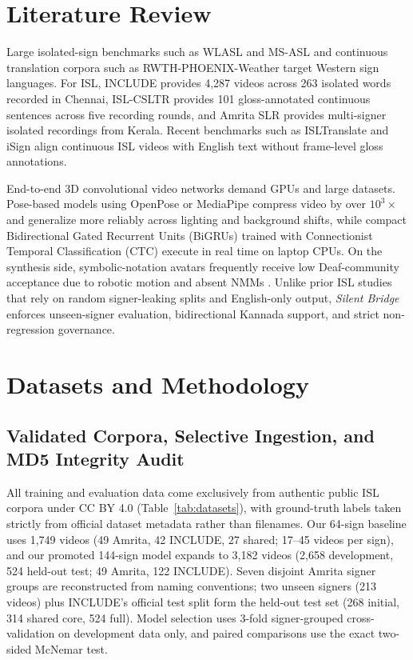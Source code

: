 \documentclass[a4paper,12pt]{article}
\begin{document}
\section{Literature Review}
Large isolated-sign benchmarks such as WLASL \cite{li2020wlasl} and MS-ASL \cite{joze2019msasl} and continuous translation corpora such as RWTH-PHOENIX-Weather \cite{koller2015phoenix,camgoz2018slt} target Western sign languages. For ISL, INCLUDE \cite{sridhar2020include} provides 4,287 videos across 263 isolated words recorded in Chennai, ISL-CSLTR \cite{elakkiya2021islcsltr} provides 101 gloss-annotated continuous sentences across five recording rounds, and Amrita SLR \cite{amrita2025slr} provides multi-signer isolated recordings from Kerala. Recent benchmarks such as ISLTranslate \cite{joshi2023isltranslate} and iSign \cite{joshi2024isign} align continuous ISL videos with English text without frame-level gloss annotations.

End-to-end 3D convolutional video networks \cite{carreira2017i3d} demand GPUs and large datasets. Pose-based models using OpenPose \cite{cao2021openpose} or MediaPipe \cite{lugaresi2019mediapipe} compress video by over $10^3\times$ and generalize more reliably across lighting and background shifts, while compact Bidirectional Gated Recurrent Units (BiGRUs) \cite{cho2014gru} trained with Connectionist Temporal Classification (CTC) \cite{graves2006ctc} execute in real time on laptop CPUs. On the synthesis side, symbolic-notation avatars frequently receive low Deaf-community acceptance due to robotic motion and absent NMMs \cite{wolfe2022avatars}. Unlike prior ISL studies that rely on random signer-leaking splits and English-only output, \textit{Silent Bridge} enforces unseen-signer evaluation, bidirectional Kannada support, and strict non-regression governance.

\section{Datasets and Methodology}
\subsection{Validated Corpora, Selective Ingestion, and MD5 Integrity Audit}
All training and evaluation data come exclusively from authentic public ISL corpora under CC BY 4.0 (Table~\ref{tab:datasets}), with ground-truth labels taken strictly from official dataset metadata rather than filenames. Our 64-sign baseline uses 1,749 videos (49 Amrita, 42 INCLUDE, 27 shared; 17--45 videos per sign), and our promoted 144-sign model expands to 3,182 videos (2,658 development, 524 held-out test; 49 Amrita, 122 INCLUDE). Seven disjoint Amrita signer groups are reconstructed from naming conventions; two unseen signers (213 videos) plus INCLUDE's official test split form the held-out test set (268 initial, 314 shared core, 524 full). Model selection uses 3-fold signer-grouped cross-validation on development data only, and paired comparisons use the exact two-sided McNemar test.
\end{document}
